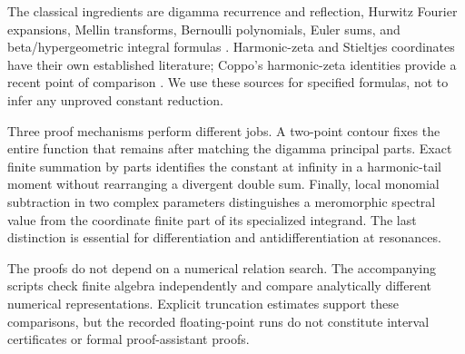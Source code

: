 The classical ingredients are digamma recurrence and reflection,
Hurwitz Fourier expansions, Mellin transforms, Bernoulli
polynomials, Euler sums, and beta/hypergeometric integral formulas
\cite{DLMF,BBG,EspinosaMoll}. Harmonic-zeta and Stieltjes
coordinates have their own established literature; Coppo's
harmonic-zeta identities provide a recent point of comparison
\cite{Coppo}. We use these sources for specified formulas, not to
infer any unproved constant reduction.

Three proof mechanisms perform different jobs. A two-point contour
fixes the entire function that remains after matching the digamma
principal parts. Exact finite summation by parts identifies the
constant at infinity in a harmonic-tail moment without rearranging
a divergent double sum. Finally, local monomial subtraction in two
complex parameters distinguishes a meromorphic spectral value
from the coordinate finite part of its specialized integrand.
The last distinction is essential for differentiation and
antidifferentiation at resonances.

The proofs do not depend on a numerical relation search. The
accompanying scripts check finite algebra independently and compare
analytically different numerical representations. Explicit
truncation estimates support these comparisons, but the recorded
floating-point runs do not constitute interval certificates or
formal proof-assistant proofs.

